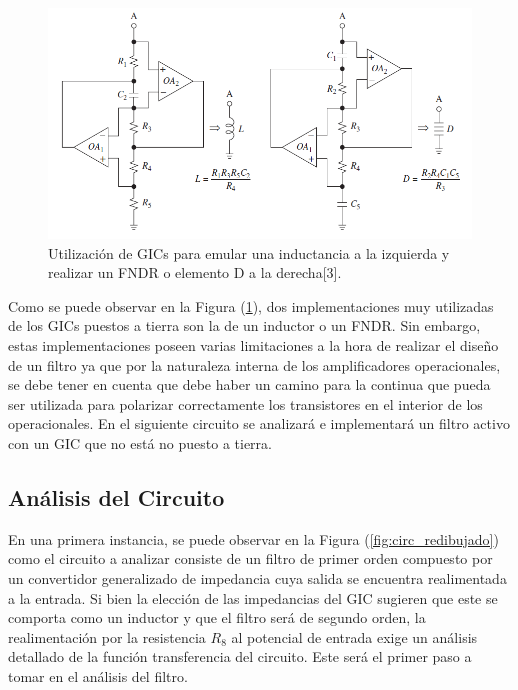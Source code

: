 \begin{figure}[H]
	\centering
	\includegraphics[width=1\textwidth]{Imagenes/gic_ind_fndr.PNG}
	\caption{Utilización de GICs para emular una inductancia a la izquierda y realizar un FNDR o elemento D a la derecha[3].}
	\label{fig:gic_ind_fndr}
\end{figure}

Como se puede observar en la Figura (\ref{fig:gic_ind_fndr}), dos implementaciones muy utilizadas de los GICs puestos a tierra son la de un inductor o un FNDR. Sin embargo, estas implementaciones poseen varias limitaciones a la hora de realizar el diseño de un filtro ya que por la naturaleza interna de los amplificadores operacionales, se debe tener en cuenta que debe haber un camino para la continua que pueda ser utilizada para polarizar correctamente los transistores en el interior de los operacionales. En el siguiente circuito se analizará e implementará un filtro activo con un GIC que no está no puesto a tierra.


\subsection{Análisis del Circuito}

En una primera instancia, se puede observar en la Figura (\ref{fig:circ_redibujado}) como el circuito a analizar consiste de un filtro de primer orden compuesto por un convertidor generalizado de impedancia cuya salida se encuentra realimentada a la entrada. Si bien la elección de las impedancias del GIC sugieren que este se comporta como un inductor y que el filtro será de segundo orden, la realimentación por la resistencia $R_8$ al potencial de entrada exige un análisis detallado de la función transferencia del circuito. Este será el primer paso a tomar en el análisis del filtro.

